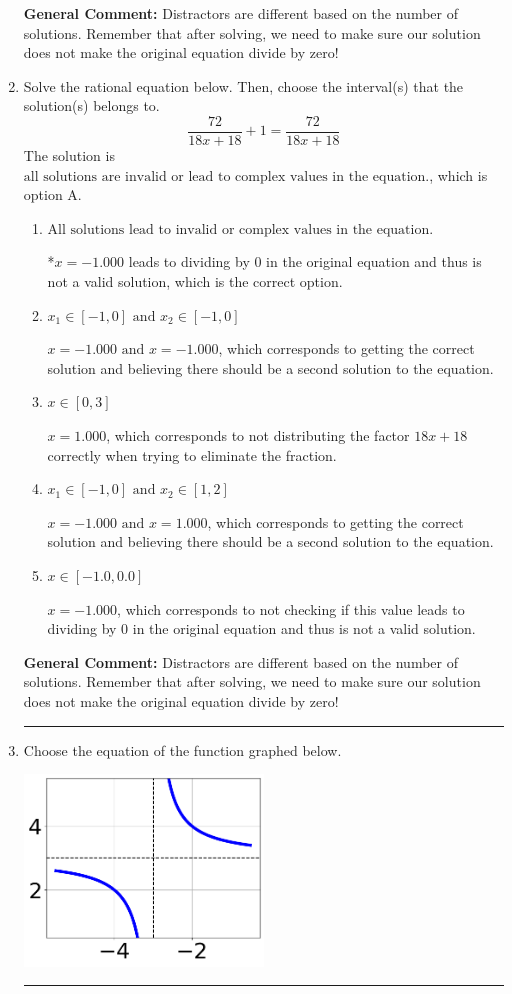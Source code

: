 \documentclass{extbook}[14pt]
\newcommand{\litem}[1]{\item #1

\rule{\textwidth}{0.4pt}}
\begin{document}
\begin{enumerate}
{\textbf{General Comment:} Distractors are different based on the number of solutions. Remember that after solving, we need to make sure our solution does not make the original equation divide by zero!
}
\litem{
Solve the rational equation below. Then, choose the interval(s) that the solution(s) belongs to.
\[ \frac{72}{18x + 18} + 1 = \frac{72}{18x + 18} \]The solution is \( \text{all solutions are invalid or lead to complex values in the equation.} \), which is option A.\begin{enumerate}[label=\Alph*.]
\item \( \text{All solutions lead to invalid or complex values in the equation.} \)

*$x = -1.000$ leads to dividing by 0 in the original equation and thus is not a valid solution, which is the correct option.
\item \( x_1 \in [-1, 0] \text{ and } x_2 \in [-1,0] \)

$x = -1.000 \text{ and } x = -1.000$, which corresponds to getting the correct solution and believing there should be a second solution to the equation.
\item \( x \in [0,3] \)

$x = 1.000$, which corresponds to not distributing the factor $18x + 18$ correctly when trying to eliminate the fraction.
\item \( x_1 \in [-1, 0] \text{ and } x_2 \in [1,2] \)

$x = -1.000 \text{ and } x = 1.000$, which corresponds to getting the correct solution and believing there should be a second solution to the equation.
\item \( x \in [-1.0,0.0] \)

$x = -1.000$, which corresponds to not checking if this value leads to dividing by 0 in the original equation and thus is not a valid solution.
\end{enumerate}

\textbf{General Comment:} Distractors are different based on the number of solutions. Remember that after solving, we need to make sure our solution does not make the original equation divide by zero!
}
\litem{
Choose the equation of the function graphed below.

\begin{center}
    \includegraphics[width=0.5\textwidth]{../Figures/rationalGraphToEquationCopyB.png}
\end{center}


}
\end{enumerate}
\end{document}
